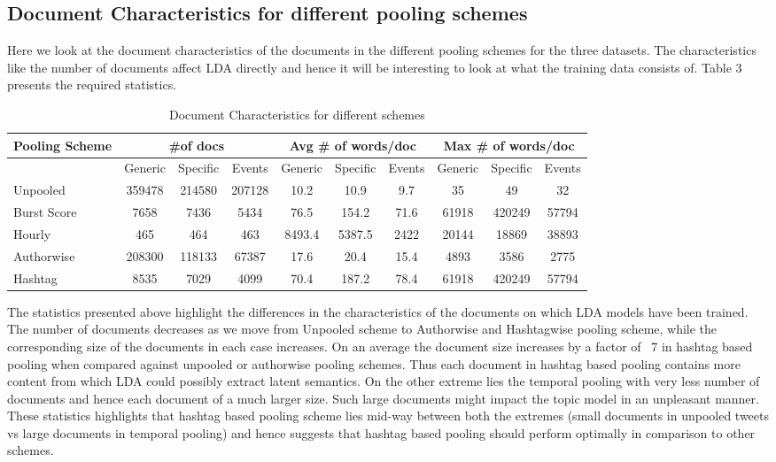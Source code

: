 \documentclass[10pt,a5paper,twoside]{article}
\begin{document}
\subsection{Document Characteristics for different pooling schemes}
Here we look at the document characteristics of the documents in the different pooling schemes for the three datasets. The characteristics like the number of documents affect LDA directly and hence it will be interesting to look at what the training data consists of. Table 3 presents the required statistics.

\begin{table}[!h]
\setcounter{table}{3}
\centering
\resizebox{14cm}{!} 
{
	\begin{tabular}{|l|ccc|ccc|ccc|}
	\hline
	Pooling Scheme  & \multicolumn {3}{c}{\#of docs} & \multicolumn {3}{c}{Avg \# of words/doc} & \multicolumn {3}{c|}{Max \# of words/doc}\\
	\hline
	 & Generic & Specific & Events &  Generic & Specific & Events &  Generic & Specific & Events\\
	\hline
	Unpooled & 359478 & 214580 & 207128 & 10.2 & 10.9 & 9.7 & 35 & 49 & 32 \\
	\hline
	Burst Score & 7658 & 7436 & 5434 & 76.5 & 154.2 & 71.6 & 61918 & 420249 & 57794 \\
	\hline
	Hourly & 465 & 464 & 463 & 8493.4 & 5387.5 & 2422 & 20144 & 18869 & 38893 \\
	\hline
	Authorwise & 208300 & 118133 & 67387 & 17.6 & 20.4 & 15.4 & 4893 & 3586 & 2775 \\
	\hline
	Hashtag & 8535 & 7029 & 4099 & 70.4 & 187.2 & 78.4 & 61918 & 420249 & 57794 \\
	\hline
	\end{tabular}
}
\caption{Document Characteristics for different schemes}\label{Table}
\end{table}

The statistics presented above highlight the differences in the characteristics of the documents on which LDA models have been trained. The number of documents decreases as we move from Unpooled scheme to Authorwise and Hashtagwise pooling scheme, while the corresponding size of the documents in each case increases. On an average the document size increases by a factor of ~7 in hashtag based pooling when compared against unpooled or authorwise pooling schemes. Thus each document in hashtag based pooling contains more content from which LDA could possibly extract latent semantics. On the other extreme lies the temporal pooling with very less number of documents and hence each document of a much larger size. Such large documents might impact the topic model in an unpleasant manner. These statistics highlights that hashtag based pooling scheme lies mid-way between both the extremes (small documents in unpooled tweets vs large documents in temporal pooling) and hence suggests that hashtag based pooling should perform optimally in comparison to other schemes.
\end{document}
